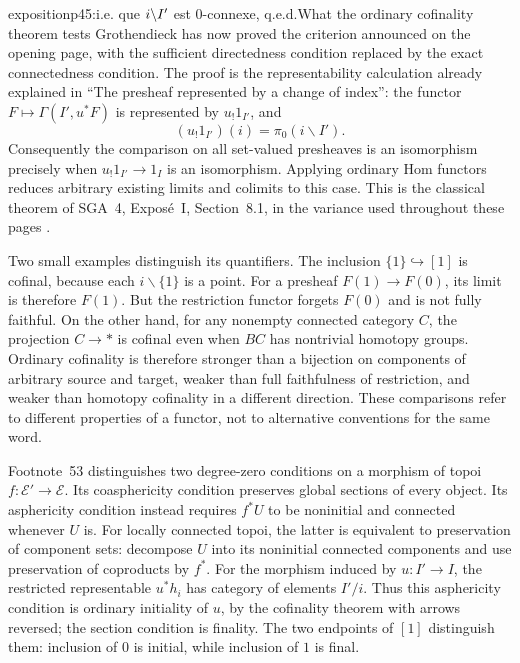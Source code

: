 \begin{dcomment}{exposition}{p45:i.e. que $i\backslash I'$ est 0-connexe, q.e.d.}{What the ordinary cofinality theorem tests}
Grothendieck has now proved the criterion announced on the opening page, with the sufficient directedness condition replaced by the exact connectedness condition. The proof is the representability calculation already explained in ``The presheaf represented by a change of index'': the functor $F\longmapsto\Gamma(I',u^*F)$ is represented by $u_!1_{I'}$, and
\[
 (u_!1_{I'})(i)=\pi_0(i\backslash I').
\]
Consequently the comparison on all set-valued presheaves is an isomorphism precisely when $u_!1_{I'}\longrightarrow1_I$ is an isomorphism. Applying ordinary Hom functors reduces arbitrary existing limits and colimits to this case. This is the classical theorem of SGA~4, Expos\'e~I, Section~8.1, in the variance used throughout these pages \citep{SGA4I1972}.

Two small examples distinguish its quantifiers. The inclusion $\{1\}\hookrightarrow[1]$ is cofinal, because each $i\backslash\{1\}$ is a point. For a presheaf $F(1)\longrightarrow F(0)$, its limit is therefore $F(1)$. But the restriction functor forgets $F(0)$ and is not fully faithful. On the other hand, for any nonempty connected category $C$, the projection $C\longrightarrow *$ is cofinal even when $BC$ has nontrivial homotopy groups. Ordinary cofinality is therefore stronger than a bijection on components of arbitrary source and target, weaker than full faithfulness of restriction, and weaker than homotopy cofinality in a different direction. These comparisons refer to different properties of a functor, not to alternative conventions for the same word.

Footnote~53 distinguishes two degree-zero conditions on a morphism of topoi $f:\mathcal E'\longrightarrow\mathcal E$. Its coasphericity condition preserves global sections of every object. Its asphericity condition instead requires $f^*U$ to be noninitial and connected whenever $U$ is. For locally connected topoi, the latter is equivalent to preservation of component sets: decompose $U$ into its noninitial connected components and use preservation of coproducts by $f^*$. For the morphism induced by $u:I'\longrightarrow I$, the restricted representable $u^*h_i$ has category of elements $I'/i$. Thus this asphericity condition is ordinary initiality of $u$, by the cofinality theorem with arrows reversed; the section condition is finality. The two endpoints of $[1]$ distinguish them: inclusion of $0$ is initial, while inclusion of $1$ is final.


\end{dcomment}
